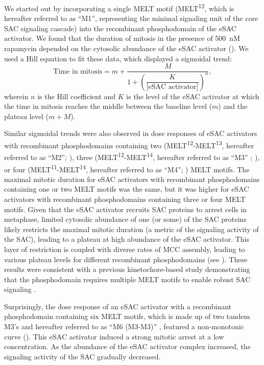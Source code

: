 We started out by incorporating a single MELT motif (MELT\textsuperscript{12}, which is hereafter referred to as ``M1'', representing the minimal signaling unit of the core SAC signaling cascade) into the recombinant phosphodomain of the eSAC activator. We found that the duration of mitosis in the presence of \SI{500}{nM} rapamycin depended on the cytosolic abundance of the eSAC activator (). We used a Hill equation to fit these data, which displayed a sigmoidal trend:
\begin{equation*}
    \text{Time in mitosis} = m + \dfrac{M}{1+(\dfrac{K}{\text{[eSAC activator]}})^n},
\end{equation*}
wherein $n$ is the Hill coefficient and $K$ is the level of the eSAC activator at which the time in mitosis reaches the middle between the baseline level ($m$) and the plateau level ($m+M$).

Similar sigmoidal trends were also observed in dose responses of eSAC activators with recombinant phosphodomains containing two (MELT\textsuperscript{12}-MELT\textsuperscript{13}, hereafter referred to as ``M2''; ), three (MELT\textsuperscript{12}-MELT\textsuperscript{14}, hereafter referred to as ``M3'' \cite{RecombinantKNL1}; ), or four (MELT\textsuperscript{11}-MELT\textsuperscript{14}, hereafter referred to as ``M4''; ) MELT motifs. The maximal mitotic duration for eSAC activators with recombinant phosphodomains containing one or two MELT motifs was the same, but it was higher for eSAC activators with recombinant phosphodomains containing three or four MELT motifs. Given that the eSAC activator recruits SAC proteins to arrest cells in metaphase, limited cytosolic abundance of one (or some) of the SAC proteins likely restricts the maximal mitotic duration (a metric of the signaling activity of the SAC), leading to a plateau at high abundance of the eSAC activator. This layer of restriction is coupled with diverse rates of MCC assembly, leading to various plateau levels for different recombinant phosphodomains (see ). These results were consistent with a previous kinetochore-based study demonstrating that the  phosphodomain requires multiple MELT motifs to enable robust SAC signaling \cite{RecombinantKNL1}.

Surprisingly, the dose response of an eSAC activator with a recombinant phosphodomain containing six MELT motifs, which is made up of two tandem M3's and hereafter referred to as ``M6 (M3-M3)'' \cite{RecombinantKNL1}, featured a non-monotonic curve (). This eSAC activator induced a strong mitotic arrest at a low concentration. As the abundance of the eSAC activator complex increased, the signaling activity of the SAC gradually decreased.

